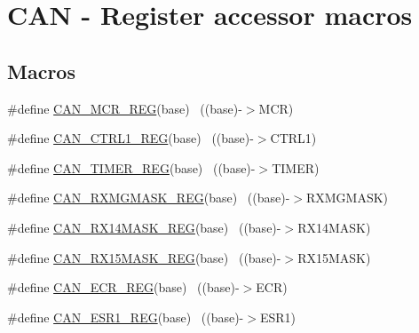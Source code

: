 \hypertarget{group___c_a_n___register___accessor___macros}{}\section{C\+AN -\/ Register accessor macros}
\label{group___c_a_n___register___accessor___macros}
\subsection*{Macros}
\begin{DoxyCompactItemize}
\item 
\#define \hyperlink{group___c_a_n___register___accessor___macros_ga266f3270836a0e2113e665b27e8469c3}{C\+A\+N\+\_\+\+M\+C\+R\+\_\+\+R\+EG}(base)                                            ~((base)-\/$>$M\+CR)
\item 
\#define \hyperlink{group___c_a_n___register___accessor___macros_gacb8258cf058657f2e55abcfb40b99344}{C\+A\+N\+\_\+\+C\+T\+R\+L1\+\_\+\+R\+EG}(base)                                        ~((base)-\/$>$C\+T\+R\+L1)
\item 
\#define \hyperlink{group___c_a_n___register___accessor___macros_ga1fed1cd31d16a8d3472d1f4f424b4fc8}{C\+A\+N\+\_\+\+T\+I\+M\+E\+R\+\_\+\+R\+EG}(base)                                        ~((base)-\/$>$T\+I\+M\+ER)
\item 
\#define \hyperlink{group___c_a_n___register___accessor___macros_gadda1f2634abb5b3f2d33cd29632be22e}{C\+A\+N\+\_\+\+R\+X\+M\+G\+M\+A\+S\+K\+\_\+\+R\+EG}(base)                                  ~((base)-\/$>$R\+X\+M\+G\+M\+A\+SK)
\item 
\#define \hyperlink{group___c_a_n___register___accessor___macros_gaf9d566ee0a69baad94e2c8c8ae19b832}{C\+A\+N\+\_\+\+R\+X14\+M\+A\+S\+K\+\_\+\+R\+EG}(base)                                  ~((base)-\/$>$R\+X14\+M\+A\+SK)
\item 
\#define \hyperlink{group___c_a_n___register___accessor___macros_ga005001dc3329b0e1fb9488ebf352e109}{C\+A\+N\+\_\+\+R\+X15\+M\+A\+S\+K\+\_\+\+R\+EG}(base)                                  ~((base)-\/$>$R\+X15\+M\+A\+SK)
\item 
\#define \hyperlink{group___c_a_n___register___accessor___macros_gaea1f06ad20b64003714c92898b52e990}{C\+A\+N\+\_\+\+E\+C\+R\+\_\+\+R\+EG}(base)                                            ~((base)-\/$>$E\+CR)
\item 
\#define \hyperlink{group___c_a_n___register___accessor___macros_ga1aa0d53df307e5204e551bcd363f01e8}{C\+A\+N\+\_\+\+E\+S\+R1\+\_\+\+R\+EG}(base)                                          ~((base)-\/$>$E\+S\+R1)

\end{DoxyCompactItemize}
